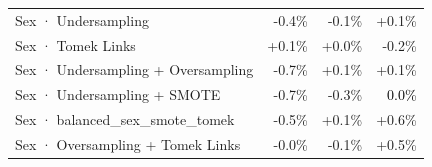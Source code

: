 \begin{table}[htbp]
\begin{tabular}{lrrr}
Sex · Undersampling & \textcolor{BrickRed}{-0.4\%} & \textcolor{BrickRed}{-0.1\%} & \textcolor{OliveGreen}{+0.1\%} \\
Sex · Tomek Links & \textcolor{OliveGreen}{+0.1\%} & \textcolor{OliveGreen}{+0.0\%} & \textcolor{BrickRed}{-0.2\%} \\
Sex · Undersampling + Oversampling & \textcolor{BrickRed}{-0.7\%} & \textcolor{OliveGreen}{+0.1\%} & \textcolor{OliveGreen}{+0.1\%} \\
Sex · Undersampling + SMOTE & \textcolor{BrickRed}{-0.7\%} & \textcolor{BrickRed}{-0.3\%} & \textcolor{black}{0.0\%} \\
Sex · balanced_sex_smote_tomek & \textcolor{BrickRed}{-0.5\%} & \textcolor{OliveGreen}{+0.1\%} & \textcolor{OliveGreen}{+0.6\%} \\
Sex · Oversampling + Tomek Links & \textcolor{BrickRed}{-0.0\%} & \textcolor{BrickRed}{-0.1\%} & \textcolor{OliveGreen}{+0.5\%} \\
\bottomrule
\end{tabular}
\end{table}